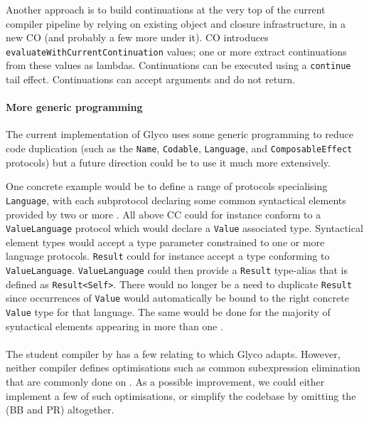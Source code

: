 \documentclass[main.tex]{subfiles}
\begin{document}
Another approach is to build continuations at the very top of the current compiler pipeline by relying on existing object and closure infrastructure, in a new  CO (and probably a few more  under it). CO introduces \texttt{evaluateWithCurrentContinuation} values; one or more  extract continuations from these values as lambdas. Continuations can be executed using a \texttt{continue} tail effect. Continuations can accept arguments and do not return.

\paragraph{More generic programming} The current implementation of Glyco uses some generic programming to reduce code duplication (such as the \texttt{Name}, \texttt{Codable}, \texttt{Language}, and \texttt{ComposableEffect} protocols) but a future direction could be to use it much more extensively.

One concrete example would be to define a range of protocols specialising \texttt{Language}, with each subprotocol declaring some common syntactical elements provided by two or more . All  above CC could for instance conform to a \texttt{ValueLanguage} protocol which would declare a \texttt{Value} associated type. Syntactical element types would accept a type parameter constrained to one or more language protocols. \texttt{Result} could for instance accept a type conforming to \texttt{ValueLanguage}. \texttt{ValueLanguage} could then provide a \texttt{Result} type-alias that is defined as \texttt{Result<Self>}. There would no longer be a need to duplicate \texttt{Result} since occurrences of \texttt{Value} would automatically be bound to the right concrete \texttt{Value} type for that language. The same would be done for the majority of syntactical elements appearing in more than one .

\paragraph{} The student compiler by \citet{compcourse} has a few  relating to  which Glyco adapts. However, neither compiler defines optimisations such as common subexpression elimination that are commonly done on . As a possible improvement, we could either implement a few of such optimisations, or simplify the codebase by omitting the   (BB and PR) altogether.


\biblio{}
\onlyinsubfile{\glsaddall\printglossaries}
\end{document}
